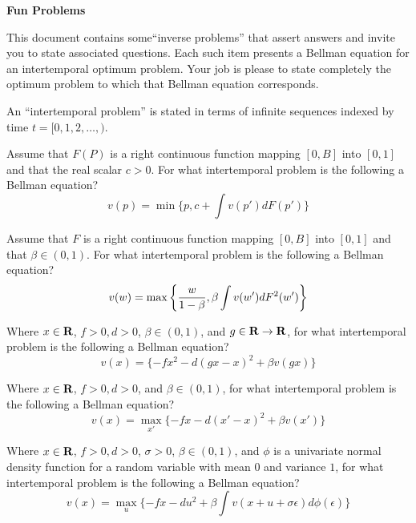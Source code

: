 

\paper

\overfullrule=0pt
\def\frac#1#2{#1\over #2}
%
\def\bmatrix#1{\left[ \matrix{#1} \right]}
\def\be{{\beta}}
\def\toone{{t+1}}

\overfullrule=0pt


\centerline{\bf  Fun Problems}


\medskip

 This document contains some``inverse problems'' that assert answers and invite you to state  associated questions.
 Each such item presents a Bellman equation for an intertemporal  optimum problem.  Your job is please to
state completely the optimum problem to which that Bellman equation corresponds. 

\medskip
{} An ``intertemporal problem'' is stated in terms of  infinite sequences indexed by time $t = [0, 1, 2, \ldots, )$.



\medskip

Assume that  $F(P)$ is a right continuous function mapping $[0, B]$ into $[0,1]$ and that the real scalar $c > 0$.  For what intertemporal problem is the following
a Bellman equation?
$$ v(p) = \min \{p, c + \int v(p') d F(p') \}$$

\medskip



  Assume that  $F$ is a right continuous function mapping $[0, B]$ into $[0,1]$ and that $\beta \in (0,1)$. For what intertemporal problem is the following a Bellman equation?
$$ v(w) = \max\left\{ {w\over{1-\beta}},  \beta \int v(w') d F^2(w') \right\} $$



\medskip
{} Where $x \in {\bf R}$, $f >0, d >0 $,   $\beta \in (0,1)$, and $g \in  {\bf R} \rightarrow {\bf R}$, for what intertemporal problem is the following  a Bellman equation?
$$ v(x) =  \{- f x^2 - d(gx  - x)^2 + \beta v(gx) \} $$


\medskip
{}   Where $x \in {\bf R}$, $f >0, d >0 $, and   $\beta \in (0,1)$, for what intertemporal problem is the following  a Bellman equation?
$$ v(x) = \max_{x'} \{ - f x - d(x' - x)^2 + \beta v(x') \} $$


\medskip
{} Where $x \in {\bf R}$, $f >0, d >0 $, $\sigma >0$,    $\beta \in (0,1)$, and $\phi$ is a univariate normal density function for a random
variable with mean $0$ and variance $1$, for what intertemporal problem is the following  a Bellman equation?
$$ v(x) = \max_{u} \{ - f x - d u^2 + \beta \int v(x +u + \sigma \epsilon) d \phi(\epsilon) \} $$



